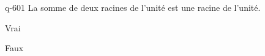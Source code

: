\begin{truefalse}{q-601}
La somme de deux racines de l'unité est une racine de l'unité.
\item Vrai
\item* Faux
\end{truefalse}

